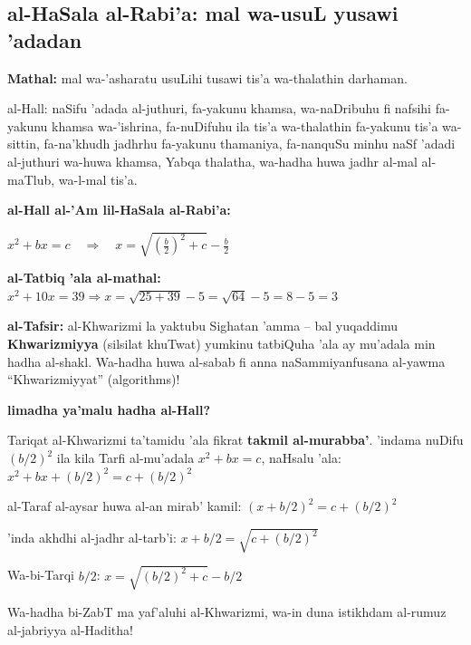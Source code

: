\documentclass[11pt,a4paper]{book}
\begin{document}
\subsection{al-HaSala al-Rabi'a: mal wa-usuL yusawi 'adadan}

\begin{originaltext}
\textbf{Mathal:} mal wa-'asharatu usuLihi tusawi tis'a wa-thalathin
darhaman.

al-Hall: naSifu 'adada al-juthuri, fa-yakunu khamsa, wa-naDribuhu fi
nafsihi fa-yakunu khamsa wa-'ishrina, fa-nuDifuhu ila tis'a
wa-thalathin fa-yakunu tis'a wa-sittin, fa-na'khudh jadhrhu fa-yakunu
thamaniya, fa-nanquSu minhu naSf 'adadi al-juthuri wa-huwa khamsa,
Yabqa thalatha, wa-hadha huwa jadhr al-mal al-maTlub, wa-l-mal
tis'a.
\end{originaltext}

\begin{mathexplain}
\textbf{al-Hall al-'Am lil-HaSala al-Rabi'a:}

\begin{center}
$\boxed{x^2 + bx = c \quad\Longrightarrow\quad x = \sqrt{\left(\frac{b}{2}\right)^2 + c} - \frac{b}{2}}$
\end{center}

\textbf{al-Tatbiq 'ala al-mathal:}
$x^2 + 10x = 39 \Rightarrow x = \sqrt{25 + 39} - 5 = \sqrt{64} - 5 = 8 - 5 = 3$

\textbf{al-Tafsir:} al-Khwarizmi la yaktubu Sighatan 'amma -- bal
yuqaddimu \textbf{Khwarizmiyya} (silsilat khuTwat) yumkinu tatbiQuha
'ala ay mu'adala min hadha al-shakl. Wa-hadha huwa al-sabab fi
anna naSammiyanfusana al-yawma ``Khwarizmiyyat'' (algorithms)!
\end{mathexplain}

\begin{commentary}
\textbf{limadha ya'malu hadha al-Hall?}

Tariqat al-Khwarizmi ta'tamidu 'ala fikrat \textbf{takmil al-murabba'}.
'indama nuDifu $(b/2)^2$ ila kila Tarfi al-mu'adala $x^2 + bx = c$,
naHsalu 'ala:
$x^2 + bx + (b/2)^2 = c + (b/2)^2$

al-Taraf al-aysar huwa al-an mirab' kamil: $(x + b/2)^2 = c + (b/2)^2$

'inda akhdhi al-jadhr al-tarb'i: $x + b/2 = \sqrt{c + (b/2)^2}$

Wa-bi-Tarqi $b/2$: $x = \sqrt{(b/2)^2 + c} - b/2$

Wa-hadha bi-ZabT ma yaf'aluhi al-Khwarizmi, wa-in duna istikhdam
al-rumuz al-jabriyya al-Haditha!
\end{commentary}
\end{document}
